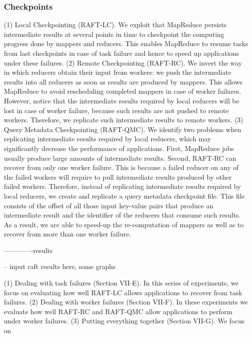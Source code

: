 \documentclass[10pt,twocolumn]{IEEEtran11}
\begin{document}
\subsubsection{Checkpoints}

(1) Local Checkpointing (RAFT-LC). We exploit that MapReduce
persists intermediate results at several points in time
to checkpoint the computing progress done by mappers and
reducers. This enables MapReduce to resume tasks from last
checkpoints in case of task failure and hence to speed up
applications under these failures.
(2) Remote Checkpointing (RAFT-RC). We invert the way in
which reducers obtain their input from workers: we push
the intermediate results into all reducers as soon as results
are produced by mappers. This allows MapReduce to avoid
rescheduling completed mappers in case of worker failures.
However, notice that the intermediate results required by
local reducers will be lost in case of worker failure, because
such results are not pushed to remote workers. Therefore, we
replicate such intermediate results to remote workers.
(3) Query Metadata Checkpointing (RAFT-QMC). We identify
two problems when replicating intermediate results required
by local reducers, which may significantly decrease the performance
of applications. First, MapReduce jobs usually produce
large amounts of intermediate results. Second, RAFT-RC can
recover from only one worker failure. This is because a
failed reducer on any of the failed workers will require to
pull intermediate results produced by other failed workers.
Therefore, instead of replicating intermediate results required
by local reducers, we create and replicate a query metadata
checkpoint file. This file consists of the offset of all those
input key-value pairs that produce an intermediate result and
the identifier of the reducers that consume such results. As a
result, we are able to speed-up the re-computation of mappers
as well as to recover from more than one worker failure.

-------------results

-- input raft results here, some graphs

(1) Dealing with task failures (Section VII-E). In this series
of experiments, we focus on evaluating how well RAFT-LC
allows applications to recover from task failures.
(2) Dealing with worker failures (Section VII-F). In these
experiments we evaluate how well RAFT-RC and RAFT-QMC
allow applications to perform under worker failures.
(3) Putting everything together (Section VII-G). We focus on
\end{document}
